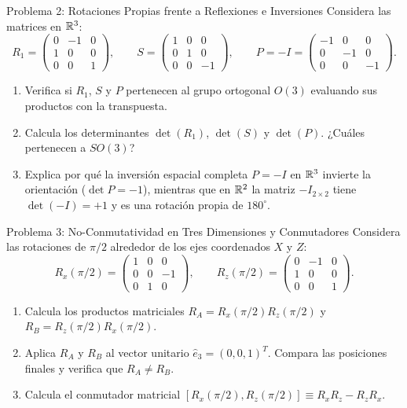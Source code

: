 \documentclass[11pt,letterpaper]{article}
\begin{document}
\begin{infobox}{Problema 2: Rotaciones Propias frente a Reflexiones e Inversiones}
Considera las matrices en $\mathbb{R}^3$:
\[
R_1 = \begin{pmatrix} 0 & -1 & 0 \\ 1 & 0 & 0 \\ 0 & 0 & 1 \end{pmatrix}, \qquad
S = \begin{pmatrix} 1 & 0 & 0 \\ 0 & 1 & 0 \\ 0 & 0 & -1 \end{pmatrix}, \qquad
P = -I = \begin{pmatrix} -1 & 0 & 0 \\ 0 & -1 & 0 \\ 0 & 0 & -1 \end{pmatrix}.
\]
\begin{enumerate}[label=(\alph*)]
    \item Verifica si $R_1$, $S$ y $P$ pertenecen al grupo ortogonal $O(3)$ evaluando sus productos con la transpuesta.
    \item Calcula los determinantes $\det(R_1)$, $\det(S)$ y $\det(P)$. ¿Cuáles pertenecen a $SO(3)$?
    \item Explica por qué la inversión espacial completa $P = -I$ en $\mathbb{R}^3$ invierte la orientación ($\det P = -1$), mientras que en $\mathbb{R}^2$ la matriz $-I_{2\times 2}$ tiene $\det(-I) = +1$ y es una rotación propia de $180^\circ$.
\end{enumerate}
\end{infobox}


\begin{infobox}{Problema 3: No-Conmutatividad en Tres Dimensiones y Conmutadores}
Considera las rotaciones de $\pi/2$ alrededor de los ejes coordenados $X$ y $Z$:
\[
R_x(\pi/2) = \begin{pmatrix} 1 & 0 & 0 \\ 0 & 0 & -1 \\ 0 & 1 & 0 \end{pmatrix}, \qquad
R_z(\pi/2) = \begin{pmatrix} 0 & -1 & 0 \\ 1 & 0 & 0 \\ 0 & 0 & 1 \end{pmatrix}.
\]
\begin{enumerate}[label=(\alph*)]
    \item Calcula los productos matriciales $R_A = R_x(\pi/2)R_z(\pi/2)$ y $R_B = R_z(\pi/2)R_x(\pi/2)$.
    \item Aplica $R_A$ y $R_B$ al vector unitario $\hat{e}_3 = (0,0,1)^T$. Compara las posiciones finales y verifica que $R_A \neq R_B$.
    \item Calcula el conmutador matricial $[R_x(\pi/2), R_z(\pi/2)] \equiv R_x R_z - R_z R_x$.
\end{enumerate}
\end{infobox}
\end{document}
